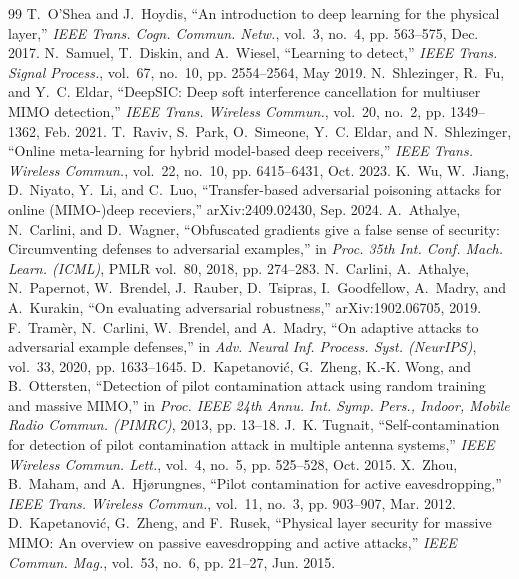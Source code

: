 \documentclass[journal]{IEEEtran}
\theoremstyle{remark}
\begin{document}
\begin{thebibliography}{99}
 T.~O'Shea and J.~Hoydis, ``An introduction to deep learning for the physical layer,'' \emph{IEEE Trans. Cogn. Commun. Netw.}, vol.~3, no.~4, pp. 563--575, Dec. 2017.
 N.~Samuel, T.~Diskin, and A.~Wiesel, ``Learning to detect,'' \emph{IEEE Trans. Signal Process.}, vol.~67, no.~10, pp. 2554--2564, May 2019.
 N.~Shlezinger, R.~Fu, and Y.~C. Eldar, ``DeepSIC: Deep soft interference cancellation for multiuser MIMO detection,'' \emph{IEEE Trans. Wireless Commun.}, vol.~20, no.~2, pp. 1349--1362, Feb. 2021.
 T.~Raviv, S.~Park, O.~Simeone, Y.~C. Eldar, and N.~Shlezinger, ``Online meta-learning for hybrid model-based deep receivers,'' \emph{IEEE Trans. Wireless Commun.}, vol.~22, no.~10, pp. 6415--6431, Oct. 2023.
 K.~Wu, W.~Jiang, D.~Niyato, Y.~Li, and C.~Luo, ``Transfer-based adversarial poisoning attacks for online (MIMO-)deep receviers,'' arXiv:2409.02430, Sep. 2024.
 A.~Athalye, N.~Carlini, and D.~Wagner, ``Obfuscated gradients give a false sense of security: Circumventing defenses to adversarial examples,'' in \emph{Proc. 35th Int. Conf. Mach. Learn. (ICML)}, PMLR vol.~80, 2018, pp. 274--283.
 N.~Carlini, A.~Athalye, N.~Papernot, W.~Brendel, J.~Rauber, D.~Tsipras, I.~Goodfellow, A.~Madry, and A.~Kurakin, ``On evaluating adversarial robustness,'' arXiv:1902.06705, 2019.
 F.~Tram{\`e}r, N.~Carlini, W.~Brendel, and A.~Madry, ``On adaptive attacks to adversarial example defenses,'' in \emph{Adv. Neural Inf. Process. Syst. (NeurIPS)}, vol.~33, 2020, pp. 1633--1645.
 D.~Kapetanovi\'c, G.~Zheng, K.-K. Wong, and B.~Ottersten, ``Detection of pilot contamination attack using random training and massive MIMO,'' in \emph{Proc. IEEE 24th Annu. Int. Symp. Pers., Indoor, Mobile Radio Commun. (PIMRC)}, 2013, pp. 13--18.
 J.~K. Tugnait, ``Self-contamination for detection of pilot contamination attack in multiple antenna systems,'' \emph{IEEE Wireless Commun. Lett.}, vol.~4, no.~5, pp. 525--528, Oct. 2015.
 X.~Zhou, B.~Maham, and A.~Hj{\o}rungnes, ``Pilot contamination for active eavesdropping,'' \emph{IEEE Trans. Wireless Commun.}, vol.~11, no.~3, pp. 903--907, Mar. 2012.
 D.~Kapetanovi\'c, G.~Zheng, and F.~Rusek, ``Physical layer security for massive MIMO: An overview on passive eavesdropping and active attacks,'' \emph{IEEE Commun. Mag.}, vol.~53, no.~6, pp. 21--27, Jun. 2015.

\end{thebibliography}
\end{document}
